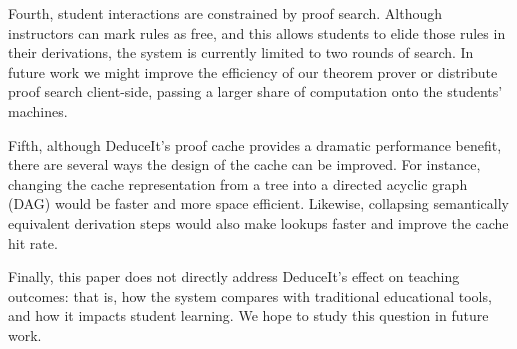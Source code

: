 \documentclass{sigchi}
\begin{document}
Fourth, student interactions are constrained by proof search. Although instructors can mark rules as free, and this allows students to elide those rules in their derivations, the system is currently limited to two rounds of search. In future work we might improve the efficiency of our theorem prover or distribute proof search client-side, passing a larger share of computation onto the students' machines.

Fifth, although DeduceIt's proof cache provides a dramatic performance benefit, there are several ways the design of the cache can be improved. For instance, changing the cache representation from a tree into a directed acyclic graph (DAG) would be faster and more space efficient. Likewise, collapsing semantically equivalent derivation steps would also make lookups faster and improve the cache hit rate.

Finally, this paper does not directly address DeduceIt's effect on teaching outcomes: that is, how the system compares with traditional educational tools, and how it impacts student learning. We hope to study this question in future work. 










\end{document}
